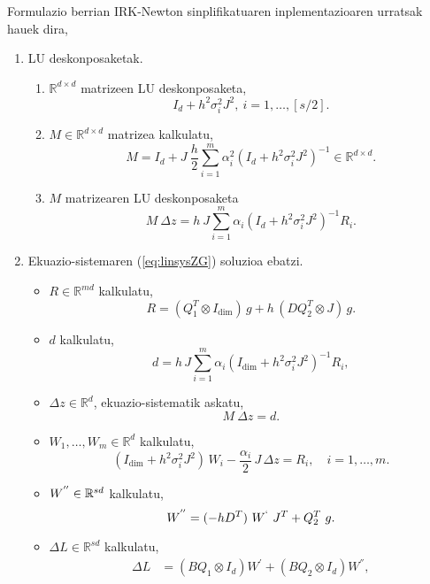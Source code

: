 Formulazio berrian IRK-Newton sinplifikatuaren inplementazioaren urratsak hauek dira,
\begin{enumerate}

\item LU deskonposaketak.
    \begin{enumerate}
     \item $\mathbb{R}^{d \times d}$ matrizeen LU deskonposaketa,
         \begin{equation*}
         I_d+h^2 \sigma_i^2 J^2, \ i=1,\dots,[s/2].
         \end{equation*}
     \item $M \in \mathbb{R}^{d \times d}$ matrizea kalkulatu,
         \begin{equation*}
          M=I_d+J \ \frac{h}{2}\sum\limits_{i=1}^{m} \alpha_i^2 (I_d+h^2 \sigma_i^2 J^2)^{-1} \in \mathbb{R}^{d \times d}.
         \end{equation*}
      \item $M$ matrizearen LU deskonposaketa
         \begin{equation*}
          M \ \Delta z=h \ J\sum\limits_{i=1}^{m}\alpha_i (I_d+h^2\sigma_i^2J^2)^{-1}R_i.
         \end{equation*}
    \end{enumerate}


\item Ekuazio-sistemaren (\ref{eq:linsysZG}) soluzioa ebatzi.
    \begin{itemize}
    \item $R \in \mathbb{R}^{md}$ kalkulatu,
    \begin{equation*}
     R=(Q_1^T  \otimes I_\dim) \, g + h \,  ( D Q_2^T \otimes J)\, g.
    \end{equation*}
    \item $d$ kalkulatu,
    \begin{equation*}
    d= h\, J \sum_{i=1}^{m} \alpha_i  (I_\dim +  h^2 \sigma_i^2 J^2)^{-1} R_i,
    \end{equation*}
    \item $\Delta z \in \mathbb{R}^d$, ekuazio-sistematik askatu,
    \begin{equation*}
    M \ \Delta z=d.
    \end{equation*} 
    \item $W_1, \dots, W_m \in \mathbb{R}^d$ kalkulatu,
    \begin{equation*}
    (I_\dim +  h^2 \sigma_i^2 J^2) \, W_i - \frac{\alpha_i}{2}\, J \, \Delta z = R_i, \quad i=1,\ldots,m.
    \end{equation*}
    \item $W^{''} \in \mathbb{R}^{sd}$ kalkulatu,
    \begin{equation*}
     W^{''} = (-hD^T) \ W^{`} \ J^T+Q_2^T \ g.
    \end{equation*}
     \item $\Delta L \in \mathbb{R}^{sd}$ kalkulatu,
     \begin{align*}
     \Delta L &=(B Q_1 \otimes I_d) W^{'}+(B Q_2 \otimes I_d) W^{''}, \\
     \end{align*}
    \end{itemize}


\end{enumerate}
